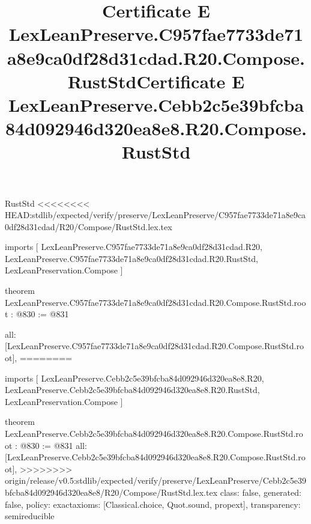 \begin{lexlean}{RustStd}
<<<<<<<< HEAD:stdlib/expected/verify/preserve/LexLeanPreserve/C957fae7733de71a8e9ca0df28d31cdad/R20/Compose/RustStd.lex.tex
\title{Certificate E LexLeanPreserve.C957fae7733de71a8e9ca0df28d31cdad.R20.Compose.RustStd}
\begin{coremodule}
imports [
  LexLeanPreserve.C957fae7733de71a8e9ca0df28d31cdad.R20,
  LexLeanPreserve.C957fae7733de71a8e9ca0df28d31cdad.R20.RustStd,
  LexLeanPreservation.Compose
]

theorem LexLeanPreserve.C957fae7733de71a8e9ca0df28d31cdad.R20.Compose.RustStd.root : @830 := @831 {
  all: [LexLeanPreserve.C957fae7733de71a8e9ca0df28d31cdad.R20.Compose.RustStd.root],
========
\title{Certificate E LexLeanPreserve.Cebb2c5e39bfcba84d092946d320ea8e8.R20.Compose.RustStd}
\begin{coremodule}
imports [
  LexLeanPreserve.Cebb2c5e39bfcba84d092946d320ea8e8.R20,
  LexLeanPreserve.Cebb2c5e39bfcba84d092946d320ea8e8.R20.RustStd,
  LexLeanPreservation.Compose
]

theorem LexLeanPreserve.Cebb2c5e39bfcba84d092946d320ea8e8.R20.Compose.RustStd.root : @830 := @831 {
  all: [LexLeanPreserve.Cebb2c5e39bfcba84d092946d320ea8e8.R20.Compose.RustStd.root],
>>>>>>>> origin/release/v0.5:stdlib/expected/verify/preserve/LexLeanPreserve/Cebb2c5e39bfcba84d092946d320ea8e8/R20/Compose/RustStd.lex.tex
  class: false,
  generated: false,
  policy: exact{axioms: [Classical.choice, Quot.sound, propext]},
  transparency: semireducible
}


\end{coremodule}}
\end{coremodule}
\end{lexlean}
